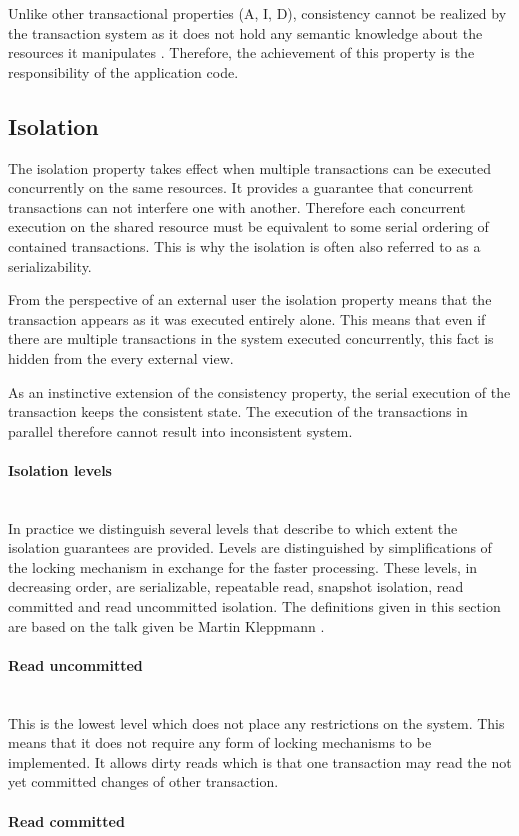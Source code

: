 \documentclass[oneside,
  digital, %
  table,   %
  nolof,     %
  nolot,     %
]{fithesis3}
\newcommand{\newlinepar}[1]{\paragraph{#1}\needspace{4\baselineskip}\mbox{}\\}
\begin{document}
Unlike other transactional properties (A, I, D), consistency cannot be realized by the transaction system as it does not hold any semantic knowledge about the resources it manipulates \cite{java_tran_processing}. Therefore, the achievement of this property is the responsibility of the application code.

\subsection{Isolation}

The isolation property takes effect when multiple transactions can be executed concurrently on the same resources. It provides a guarantee that concurrent transactions can not interfere one with another. Therefore each concurrent execution on the shared resource must be equivalent to some serial ordering of contained transactions. This is why the isolation is often also referred to as a serializability.

From the perspective of an external user the isolation property means that the transaction appears as it was executed entirely alone. This means that even if there are multiple transactions in the system executed concurrently, this fact is hidden from the every external view.

As an instinctive extension of the consistency property, the serial execution of the transaction keeps the consistent state. The execution of the transactions in parallel therefore cannot result into inconsistent system.

\newlinepar{Isolation levels}

In practice we distinguish several levels that describe to which extent the isolation guarantees are provided. Levels are distinguished by simplifications of the locking mechanism in exchange for the faster processing. These levels, in decreasing order, are serializable, repeatable read, snapshot isolation, read committed and read uncommitted isolation. The definitions given in this section are based on the talk given be Martin Kleppmann \cite{isolation_levels}.

\newlinepar{Read uncommitted}

This is the lowest level which does not place any restrictions on the system. This means that it does not require any form of locking mechanisms to be implemented. It allows dirty reads which is that one transaction may read the not yet committed changes of other transaction.

\newlinepar{Read committed}
\end{document}
